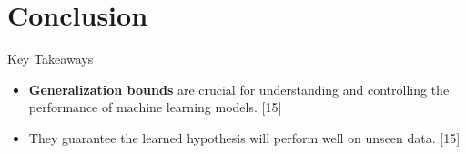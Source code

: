 \documentclass[
  ignorenonframetext,
]{beamer}
\providecommand{\tightlist}{%
  \setlength{\itemsep}{0pt}\setlength{\parskip}{0pt}}\usepackage{longtable,booktabs,array}
\begin{document}
\section{Conclusion}\label{conclusion}

\begin{frame}{Key Takeaways}
\label{key-takeaways}
\begin{itemize}
\tightlist
\item
  \textbf{Generalization bounds} are crucial for understanding and
  controlling the performance of machine learning models. {[}15{]}
\item
  They guarantee the learned hypothesis will perform well on unseen
  data. {[}15{]}
\end{itemize}
\end{frame}
\end{document}
